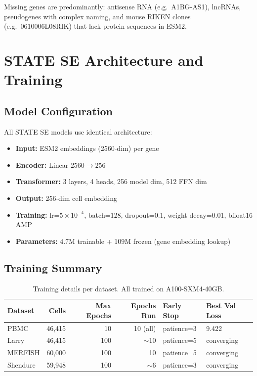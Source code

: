 \documentclass[11pt,a4paper]{article}
\begin{document}
\noindent Missing genes are predominantly: antisense RNA (e.g.\ A1BG-AS1), lncRNAs, pseudogenes with complex naming, and mouse RIKEN clones (e.g.\ 0610006L08RIK) that lack protein sequences in ESM2.

\section{STATE SE Architecture and Training}

\subsection{Model Configuration}
All STATE SE models use identical architecture:
\begin{itemize}
    \item \textbf{Input:} ESM2 embeddings (2560-dim) per gene
    \item \textbf{Encoder:} Linear $2560 \to 256$
    \item \textbf{Transformer:} 3 layers, 4 heads, 256 model dim, 512 FFN dim
    \item \textbf{Output:} 256-dim cell embedding
    \item \textbf{Training:} lr=$5\times10^{-4}$, batch=128, dropout=0.1, weight decay=0.01, bfloat16 AMP
    \item \textbf{Parameters:} 4.7M trainable + 109M frozen (gene embedding lookup)
\end{itemize}

\subsection{Training Summary}

\begin{table}[H]
\centering
\caption{Training details per dataset. All trained on A100-SXM4-40GB.}
\label{tab:training}
\begin{tabular}{lrrrll}
\toprule
Dataset & Cells & Max Epochs & Epochs Run & Early Stop & Best Val Loss \\
\midrule
PBMC      & 46,415  & 10  & 10 (all) & patience=3 & 9.422 \\
Larry     & 46,415  & 100 & $\sim$10 & patience=5 & converging \\
MERFISH   & 60,000  & 100 & 10       & patience=5 & converging \\
Shendure  & 59,948  & 100 & $\sim$6  & patience=3 & converging \\
\bottomrule
\end{tabular}
\end{table}
\end{document}
